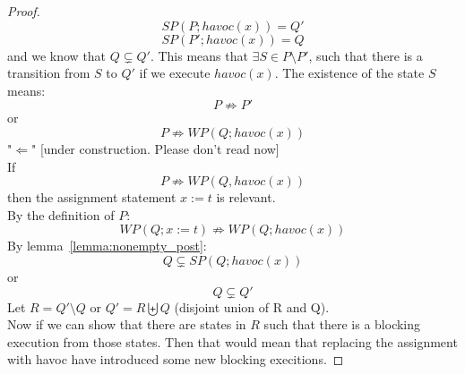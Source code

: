 \documentclass{article}
\newcommand{\limp}{\Rightarrow}
\begin{document}
\begin{proof}
$$SP(P; havoc(x)) = Q'$$
$$SP(P'; havoc(x)) = Q$$
and we know that $Q \subsetneq Q'$. This means that $\exists S \in P \setminus P'$, such that there is a transition from $S$ to $Q'$ if we execute $havoc(x)$. The existence of the state $S$ means:
$$P \not \limp P'$$
or
$$P \not \limp WP(Q; havoc(x))$$
"$\Leftarrow$" [under construction. Please don't read now]\\
If 
$$P \not \limp WP(Q,havoc(x))$$
then the assignment statement $x:=t$ is relevant.\\
By the definition of $P$:
$$WP(Q; x:=t) \not \limp WP(Q;havoc(x))$$
By lemma~\ref{lemma:nonempty_post}:
$$Q \subsetneq SP(Q; havoc(x))$$
or
$$Q \subsetneq Q'$$
Let $R = Q' \setminus Q$ or $Q' = R \biguplus Q$ (disjoint union of R and Q).\\
Now if we can show that there are states in $R$ such that there is a blocking execution from those states. Then that would mean that replacing the assignment with havoc have introduced some new blocking execitions.

\end{proof}
\end{document}

